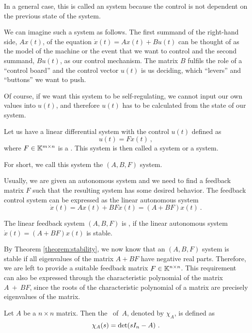 In a general case, this is called an  system because the control is not dependent on the previous state of the system.

We can imagine such a system as follows. The first summand of the right-hand side, $Ax(t)$, of the equation $\dot{x}(t)=Ax(t)+Bu(t)$ can be thought of as the model of the machine or the event that we want to control and the second summand, $Bu(t)$, as our control mechanism. The matrix $B$ fulfils the role of a ``control board'' and the control vector $u(t)$ is us deciding, which ``levers'' and ``buttons'' we want to push. 

Of course, if we want this system to be self-regulating, we cannot input our own values into $u(t)$, and therefore $u(t)$ has to be calculated from the state of our system.

\begin{definition}
	Let us have a linear differential system with the control $u(t)$ defined as
	$$u(t)=Fx(t)\ ,$$
	where $F\in\mathbb{K}^{m\times n}$ is a . This system is then called a  system or a  system.

	For short, we call this system the $(A,B,F)$ system.
\end{definition}

Usually, we are given an autonomous system and we need to find a feedback matrix $F$ such that the resulting system has some desired behavior. The feedback control system can be expressed as the linear autonomous system
$$\dot{x}(t)=Ax(t)+BFx(t)=(A+BF)x(t)\ .$$

\begin{definition}
	The linear feedback system $(A,B,F)$ is , if the linear autonomous system $\dot{x}(t)=(A+BF)x(t)$ is stable.
\end{definition}

By Theorem \ref{theorem:stability}, we now know that an $(A,B,F)$ system is stable if all eigenvalues of the matrix $A+BF$ have negative real parts. Therefore, we are left to provide a suitable feedback matrix $F \in \mathbb{K}^{n \times n}$. This requirement can also be expressed through the characteristic polynomial of the matrix $A~+~BF$, since the roots of the characteristic polynomial of a matrix are precisely eigenvalues of the matrix.

\begin{definition}
	Let $A$ be a $n\times n$ matrix. Then the ~of~$A$, denoted by $\chi_A$, is defined as $$\chi_A(s)=\textnormal{det}(sI_n-A)\ .$$
\end{definition}

